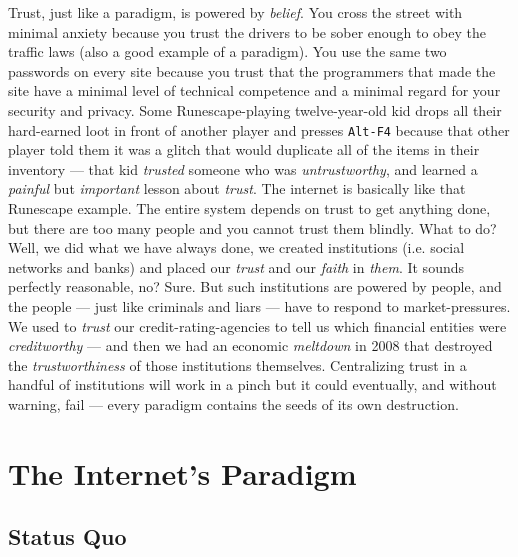 \documentclass[a4paper]{article}
\begin{document}
Trust, just like a paradigm, is powered by \emph{belief}. You cross the street with minimal anxiety because you trust the drivers to be sober enough to obey the traffic laws (also a good example of a paradigm). You use the same two passwords on every site because you trust that the programmers that made the site have a minimal level of technical competence and a minimal regard for your security and privacy. Some Runescape-playing twelve-year-old kid drops all their hard-earned loot in front of another player and presses \verb|Alt-F4| because that other player told them it was a glitch that would duplicate all of the items in their inventory ---  that kid \emph{trusted} someone who was \emph{untrustworthy}, and learned a \emph{painful} but \emph{important} lesson about \emph{trust}. The internet is basically like that Runescape example. The entire system depends on trust to get anything done, but there are too many people and you cannot trust them blindly. What to do? Well, we did what we have always done, we created institutions (i.e. social networks and banks) and placed our \emph{trust} and our \emph{faith} in \emph{them}. It sounds perfectly reasonable, no? Sure. But such institutions are powered by people, and the people ---  just like criminals and liars ---  have to respond to market-pressures. We used to \emph{trust} our credit-rating-agencies to tell us which financial entities were \emph{creditworthy} ---  and then we had an economic \emph{meltdown} in 2008 that destroyed the \emph{trustworthiness} of those institutions themselves. Centralizing trust in a handful of institutions will work in a pinch but it could eventually, and without warning, fail ---  every paradigm contains the seeds of its own destruction.
\section{The Internet's Paradigm}
\label{The Internet's Paradigm}
\subsection{Status Quo}
\label{Status Quo}
\end{document}
